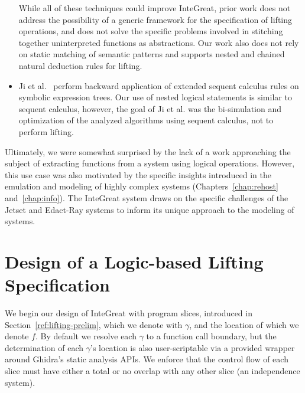 \begin{itemize}
	While all of these techniques could improve InteGreat, prior work does not address the possibility of a generic framework for the specification of lifting operations, and does not solve the specific problems involved in stitching together uninterpreted functions as abstractions.
	Our work also does not rely on static matching of semantic patterns and supports nested and chained natural deduction rules for lifting.
	\item Ji et al.~\cite{transformation} perform backward application of extended sequent calculus rules on symbolic expression trees.
	Our use of nested logical statements is similar to sequent calculus, however, the goal of Ji et al. was the bi-simulation and optimization of the analyzed algorithms using sequent calculus, not to perform lifting.
\end{itemize}

Ultimately, we were somewhat surprised by the lack of a work approaching the subject of extracting functions from a system using logical operations.
However, this use case was also motivated by the specific insights introduced in the emulation and modeling of highly complex systems (Chapters~\ref{chap:rehost} and~\ref{chap:info}).
The InteGreat system draws on the specific challenges of the Jetset and Edact-Ray systems to inform its unique approach to the modeling of systems.

\section{Design of a Logic-based Lifting Specification}

We begin our design of InteGreat with program slices, introduced in Section~\ref{ref:lifting-prelim}, which we denote with $\gamma$, and the location of which we denote $f$.
By default we resolve each $\gamma$ to a function call boundary, but the determination of each $\gamma$'s location is also user-scriptable via a provided wrapper around Ghidra's static analysis APIs.
We enforce that the control flow of each slice must have either a total or no overlap with any other slice (an independence system).

